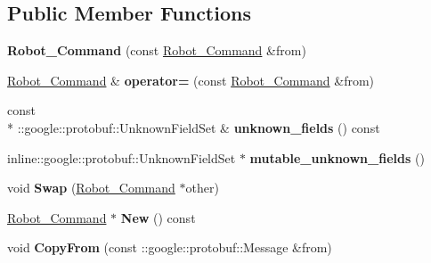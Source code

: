 \subsection*{Public Member Functions}
\begin{DoxyCompactItemize}
\item 
\hypertarget{classvss__command_1_1Robot__Command_aec1028695262ac9887a661768f2f8bb1}{{\bfseries Robot\-\_\-\-Command} (const \hyperlink{classvss__command_1_1Robot__Command}{Robot\-\_\-\-Command} \&from)}\label{classvss__command_1_1Robot__Command_aec1028695262ac9887a661768f2f8bb1}

\item 
\hypertarget{classvss__command_1_1Robot__Command_afebc3c2ee761027356ce0fabe568ae11}{\hyperlink{classvss__command_1_1Robot__Command}{Robot\-\_\-\-Command} \& {\bfseries operator=} (const \hyperlink{classvss__command_1_1Robot__Command}{Robot\-\_\-\-Command} \&from)}\label{classvss__command_1_1Robot__Command_afebc3c2ee761027356ce0fabe568ae11}

\item 
\hypertarget{classvss__command_1_1Robot__Command_a9df4b6bca5721e6b1ae945dc975af2c6}{const \\*
\-::google\-::protobuf\-::\-Unknown\-Field\-Set \& {\bfseries unknown\-\_\-fields} () const }\label{classvss__command_1_1Robot__Command_a9df4b6bca5721e6b1ae945dc975af2c6}

\item 
\hypertarget{classvss__command_1_1Robot__Command_ac59c88c8dcf9b0e1128e845e238a92d4}{inline\-::google\-::protobuf\-::\-Unknown\-Field\-Set $\ast$ {\bfseries mutable\-\_\-unknown\-\_\-fields} ()}\label{classvss__command_1_1Robot__Command_ac59c88c8dcf9b0e1128e845e238a92d4}

\item 
\hypertarget{classvss__command_1_1Robot__Command_aab4cd2f4e6d3316f414fa32e7ccf1660}{void {\bfseries Swap} (\hyperlink{classvss__command_1_1Robot__Command}{Robot\-\_\-\-Command} $\ast$other)}\label{classvss__command_1_1Robot__Command_aab4cd2f4e6d3316f414fa32e7ccf1660}

\item 
\hypertarget{classvss__command_1_1Robot__Command_a16862f509cc6ad30afa51daa6f18ab73}{\hyperlink{classvss__command_1_1Robot__Command}{Robot\-\_\-\-Command} $\ast$ {\bfseries New} () const }\label{classvss__command_1_1Robot__Command_a16862f509cc6ad30afa51daa6f18ab73}

\item 
\hypertarget{classvss__command_1_1Robot__Command_a44b1cba95f68eb9c9349d1f06b0567db}{void {\bfseries Copy\-From} (const \-::google\-::protobuf\-::\-Message \&from)}\label{classvss__command_1_1Robot__Command_a44b1cba95f68eb9c9349d1f06b0567db}


\end{DoxyCompactItemize}
